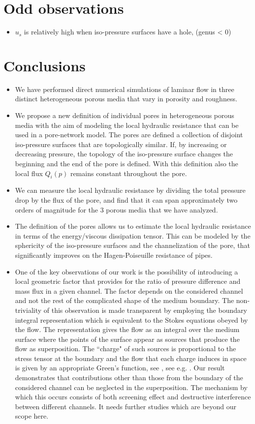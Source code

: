 \documentclass[draft]{agujournal2019}
\begin{document}
\section{Odd observations}
\begin{itemize}
	\item $u_s$ is relatively high when iso-pressure surfaces have a hole, (genus < 0)
\end{itemize}

\section{Conclusions}
\begin{itemize}
	\item We have performed direct numerical simulations of laminar flow in three distinct heterogeneous porous media that vary in porosity and roughness.  
	\item We propose a new definition of individual pores in heterogeneous porous media with the aim of modeling the local hydraulic resistance that can be used in a pore-network model. The pores are defined a collection of disjoint iso-pressure surfaces that are topologically similar. If, by increasing or decreasing pressure, the topology of the iso-pressure surface changes the beginning and the end of the pore is defined. With this definition also the local flux $Q_i(p)$ remains constant throughout the pore. 
	\item We can measure the local hydraulic resistance by dividing the total pressure drop by the flux of the pore, and find that it can span approximately two orders of magnitude for the 3 porous media that we have analyzed. 
	\item The definition of the pores allows us to estimate the local hydraulic resistance in terms of the energy/viscous dissipation tensor. This can be modeled by the sphericity of the iso-pressure surfaces and the channelization of the pore, that significantly improves on the Hagen-Poiseuille resistance of pipes. 
	\item One of the key observations of our work is the possibility of introducing a local geometric factor that provides for the ratio of pressure difference and mass flux in a given channel. The factor depends on the considered channel and not the rest of the complicated shape of the medium boundary. The non-triviality of this observation is made transparent by employing the boundary integral representation which is equivalent to the Stokes equations obeyed by the flow. The representation gives the flow as an integral over the medium surface where the points of the surface appear as sources that produce the flow as superposition. The ``charge" of such sources is proportional to the stress tensor at the boundary and the flow that each charge induces in space is given by an appropriate Green's function, see , see e.g. \cite{pozrikidis_boundary_1992}. Our result demonstrates that contributions other than those from the boundary of the considered channel can be neglected in the superposition. The mechanism by which this occurs consists of both screening effect and destructive interference between different channels. It needs further studies which are beyond our scope here.
\end{itemize}
\end{document}
